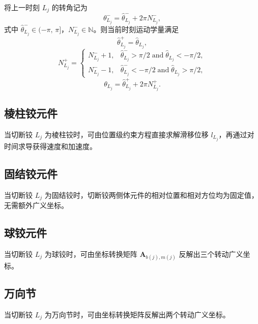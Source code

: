 将上一时刻 $L_j$ 的转角记为
\begin{equation}\label{eq:10.48}
  \theta_{L_j}^- = \hat{\theta}_{L_j}^- + 2\pi N_{L_j}^-,
\end{equation}
式中 $\hat{\theta}_{L_j}^- \in (-\pi,\,\pi]$，$N_{L_j}^- \in \mathbb{N}$。则当前时刻运动学量满足
\begin{equation}\label{eq:10.49}
  \hat{\theta}_{L_j}^+ = \hat{\theta}_{L_j},
\end{equation}
\begin{equation}\label{eq:10.50}
  N_{L_j}^+ = \begin{cases}
    N_{L_j}^- + 1, & \hat{\theta}_{L_j}^- > \pi/2 \;\text{and}\; \hat{\theta}_{L_j} < -\pi/2, \\
    N_{L_j}^- - 1, & \hat{\theta}_{L_j}^- < -\pi/2 \;\text{and}\; \hat{\theta}_{L_j} > \pi/2,
  \end{cases}
\end{equation}
\begin{equation}\label{eq:10.51}
  \theta_{L_j} = \hat{\theta}_{L_j}^+ + 2\pi N_{L_j}^+.
\end{equation}

\subsection{棱柱铰元件}

当切断铰 $L_j$ 为棱柱铰时，可由位置级约束方程直接求解滑移位移 $l_{L_j}$，再通过对时间求导获得速度和加速度。

\subsection{固结铰元件}

当切断铰 $L_j$ 为固结铰时，切断铰两侧体元件的相对位置和相对方位均为固定值，无需额外广义坐标。

\subsection{球铰元件}

当切断铰 $L_j$ 为球铰时，可由坐标转换矩阵 $\boldsymbol{A}_{b(j),m(j)}$ 反解出三个转动广义坐标。

\subsection{万向节}

当切断铰 $L_j$ 为万向节时，可由坐标转换矩阵反解出两个转动广义坐标。


